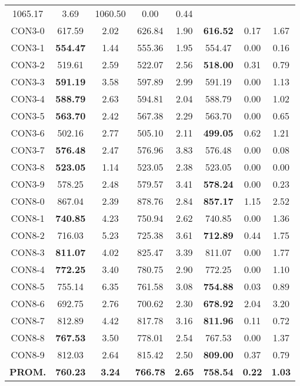 \begin{table}[h]
\begin{tabular}{c c c c c c c c}
1065.17 & 3.69 & 1060.50 & 0.00
 & 0.44\\CON3-0 & 617.59 & 2.02 & 
626.84 & 1.90 & \bf{616.52} & 
0.17 & 1.67\\CON3-1 & \bf{554.47} & 1.44 & 
555.36 & 1.95 & 554.47 & 0.00
 & 0.16\\CON3-2 & 519.61 & 2.59 & 
522.07 & 2.56 & \bf{518.00} & 
0.31 & 0.79\\CON3-3 & \bf{591.19} & 3.58 & 
597.89 & 2.99 & 591.19 & 0.00
 & 1.13\\CON3-4 & \bf{588.79} & 2.63 & 
594.81 & 2.04 & 588.79 & 0.00
 & 1.02\\CON3-5 & \bf{563.70} & 2.42 & 
567.38 & 2.29 & 563.70 & 0.00
 & 0.65\\CON3-6 & 502.16 & 2.77 & 
505.10 & 2.11 & \bf{499.05} & 
0.62 & 1.21\\CON3-7 & \bf{576.48} & 2.47 & 
576.96 & 3.83 & 576.48 & 0.00
 & 0.08\\CON3-8 & \bf{523.05} & 1.14 & 
523.05 & 2.38 & 523.05 & 0.00
 & 0.00\\
CON3-9 & 578.25 & 2.48 & 
579.57 & 3.41 & \bf{578.24} & 
0.00 & 0.23\\CON8-0 & 867.04 & 2.39 & 
878.76 & 2.84 & \bf{857.17} & 
1.15 & 2.52\\CON8-1 & \bf{740.85} & 4.23 & 
750.94 & 2.62 & 740.85 & 0.00
 & 1.36\\CON8-2 & 716.03 & 5.23 & 
725.38 & 3.61 & \bf{712.89} & 
0.44 & 1.75\\CON8-3 & \bf{811.07} & 4.02 & 
825.47 & 3.39 & 811.07 & 0.00
 & 1.77\\CON8-4 & \bf{772.25} & 3.40 & 
780.75 & 2.90 & 772.25 & 0.00
 & 1.10\\CON8-5 & 755.14 & 6.35 & 
761.58 & 3.08 & \bf{754.88} & 
0.03 & 0.89\\CON8-6 & 692.75 & 2.76 & 
700.62 & 2.30 & \bf{678.92} & 
2.04 & 3.20\\CON8-7 & 812.89 & 4.42 & 
817.78 & 3.16 & \bf{811.96} & 
0.11 & 0.72\\CON8-8 & \bf{767.53} & 3.50 & 
778.01 & 2.54 & 767.53 & 0.00
 & 1.37\\CON8-9 & 812.03 & 2.64 & 
815.42 & 2.50 & \bf{809.00} & 
0.37 & 0.79\\\bf{PROM.} & 
\bf{760.23} & \bf{3.24} & \bf{766.78} & \bf{2.65} & \bf{758.54} & \bf{0.22} & \bf{1.03}\\[1ex]\hline
\end{tabular}
\label{table:nonlin}
\end{table}

